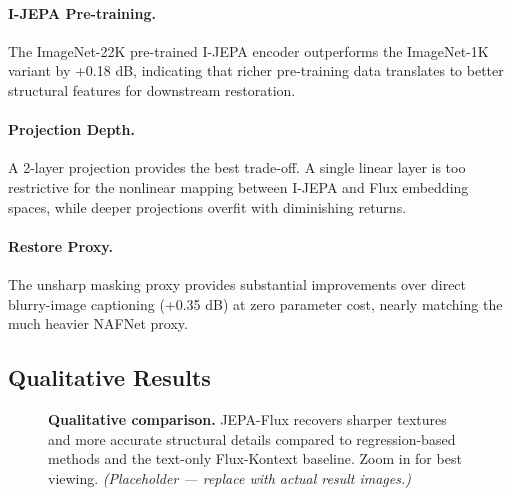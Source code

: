 \documentclass{article}
\begin{document}
\paragraph{I-JEPA Pre-training.}
The ImageNet-22K pre-trained I-JEPA encoder outperforms the ImageNet-1K variant by +0.18 dB, indicating that richer pre-training data translates to better structural features for downstream restoration.

\paragraph{Projection Depth.}
A 2-layer projection provides the best trade-off. A single linear layer is too restrictive for the nonlinear mapping between I-JEPA and Flux embedding spaces, while deeper projections overfit with diminishing returns.

\paragraph{Restore Proxy.}
The unsharp masking proxy provides substantial improvements over direct blurry-image captioning (+0.35 dB) at zero parameter cost, nearly matching the much heavier NAFNet proxy.

\subsection{Qualitative Results}

\begin{figure}[t]
    \centering
    \caption{\textbf{Qualitative comparison.} JEPA-Flux recovers sharper textures and more accurate structural details compared to regression-based methods and the text-only Flux-Kontext baseline. Zoom in for best viewing. \textit{(Placeholder --- replace with actual result images.)}}
    \label{fig:qualitative}
\end{figure}
\end{document}
